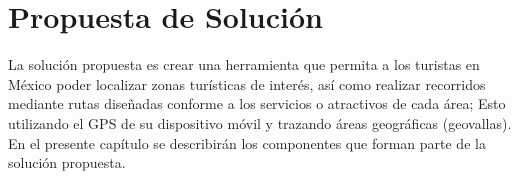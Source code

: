 \chapter{Propuesta de Solución}
La solución propuesta es crear una herramienta que permita a los turistas en México poder localizar zonas turísticas de interés, así como realizar recorridos mediante rutas diseñadas conforme a los servicios o atractivos de cada área; Esto utilizando el GPS de su dispositivo móvil y trazando áreas geográficas (geovallas). En el presente capítulo se describirán los componentes que forman parte de la solución propuesta. 









